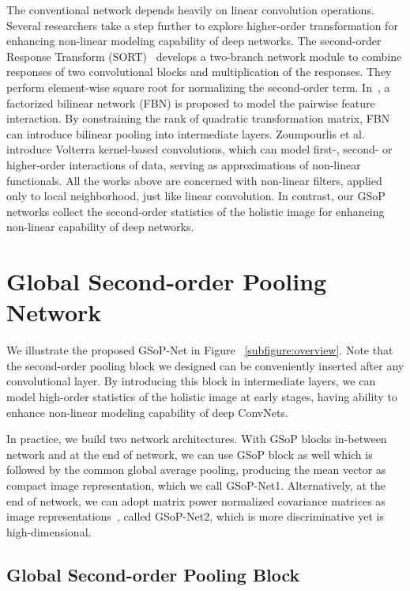 \documentclass[10pt,twocolumn,letterpaper]{article}
\begin{document}
The conventional network depends heavily  on linear convolution operations. Several researchers take a step further to explore higher-order transformation  for enhancing non-linear modeling  capability of deep networks. The second-order Response Transform (SORT)~\cite{Wang_2017_ICCV} develops a two-branch network module to combine responses of two  convolutional blocks and  multiplication of the responses. They perform element-wise square root for normalizing the second-order term. 
In~\cite{LiYanghao_2017_ICCV}, a factorized bilinear network (FBN) is proposed to model the pairwise feature interaction. By constraining  the rank of quadratic transformation  matrix, FBN can introduce bilinear  pooling into intermediate  layers.  Zoumpourlis et al.~\cite{Zoumpourlis_2017_ICCV} introduce Volterra kernel-based convolutions, which can model first-, second- or higher-order interactions of data, serving as approximations of non-linear functionals. All the  works above are concerned with non-linear filters, applied only to local neighborhood, just  like linear convolution. In contrast, our GSoP networks collect  the second-order statistics of the holistic image for enhancing  non-linear capability  of deep networks.  


  

\section{Global Second-order Pooling Network}\label{section:proposed}


We illustrate the proposed GSoP-Net in Figure  ~\ref{subfigure:overview}.  Note that  the  second-order pooling block we designed  can be conveniently  inserted after any convolutional layer. By introducing this block in intermediate  layers, we can model high-order statistics of the holistic image at early stages, having ability to enhance  non-linear modeling capability of deep ConvNets.


In practice, we build two network architectures. With GSoP blocks in-between network and at the end of network, we can use GSoP block as well which is followed by the common global average pooling, producing the mean vector as compact image representation, which  we call  GSoP-Net1. Alternatively, at the end of network, we can adopt matrix power normalized covariance matrices as image representations~\cite{Li_2017_ICCV}, called GSoP-Net2, which is more discriminative yet is high-dimensional. 


\subsection{Global Second-order Pooling  Block}\label{subsection:channel-block}
\end{document}
